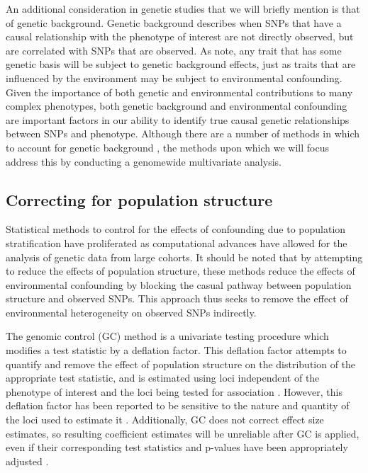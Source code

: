 An additional consideration in genetic studies that we will briefly mention is that of genetic background. Genetic background describes when SNPs that have a causal relationship with the phenotype of interest are not directly observed, but are correlated with SNPs that are observed. As \citep{vilhjalmsson2012nature} note, any trait that has some genetic basis will be subject to genetic background effects, just as traits that are influenced by the environment may be subject to environmental confounding. Given the importance of both genetic and environmental contributions to many complex phenotypes, both genetic background and environmental confounding are important factors in our ability to identify true causal genetic relationships between SNPs and phenotype. Although there are a number of methods in which to account for genetic background , the methods upon which we will focus address this by conducting a genomewide multivariate analysis.

\subsection{Correcting for population structure}

Statistical methods to control for the effects of confounding due to population stratification have proliferated as computational advances have allowed for the analysis of genetic data from large cohorts. It should be noted that by attempting to reduce the effects of population structure, these methods reduce the effects of environmental confounding by blocking the casual pathway between population structure and observed SNPs. This approach thus seeks to remove the effect of environmental heterogeneity on observed SNPs indirectly.


The genomic control (GC) method is a univariate testing procedure which modifies a test statistic by a deflation factor. This deflation factor attempts to quantify and remove the effect of population structure on the distribution of the appropriate test statistic, and is estimated using loci independent of the phenotype of interest and the loci being tested for association \citep{devlin1999genomic, bacanu2000power, wang2009testing}. However, this deflation factor has been reported to be sensitive to the nature and quantity of the loci used to estimate it \citep{hellwege2017population, marchini2004effects}. Additionally, GC does not correct effect size estimates, so resulting coefficient estimates will be unreliable after GC is applied, even if their corresponding test statistics and p-values have been appropriately adjusted \citep{hellwege2017population}.

